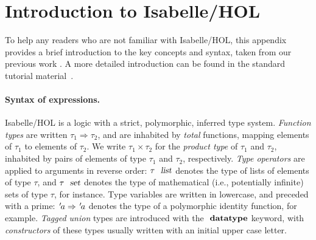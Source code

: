 \section{Introduction to Isabelle/HOL}
\label{sect:appendix:isabelle}

To help any readers who are not familiar with Isabelle/HOL, this appendix provides a brief introduction to the key concepts and syntax, taken from our previous work \cite{Gomes:2017gy}.
A more detailed introduction can be found in the standard tutorial material~\cite{DBLP:books/sp/NipkowK14}.

\paragraph{Syntax of expressions.}

Isabelle/HOL is a logic with a strict, polymorphic, inferred type system.
\emph{Function types} are written $\tau_1 \Rightarrow \tau_2$, and are inhabited by \emph{total} functions, mapping elements of $\tau_1$ to elements of $\tau_2$.
We write $\tau_1 \times \tau_2$ for the \emph{product type} of $\tau_1$ and $\tau_2$, inhabited by pairs of elements of type $\tau_1$ and $\tau_2$, respectively.
\emph{Type operators} are applied to arguments in reverse order: $\tau\ \isa{list}$ denotes the type of lists of elements of type $\tau$, and $\tau\ \isa{set}$ denotes the type of mathematical (i.e., potentially infinite) sets of type $\tau$, for instance.
Type variables are written in lowercase, and preceded with a prime: ${\emph{$\mskip2mu{'}\mskip-2mu$}}a \Rightarrow {\emph{$\mskip2mu{'}\mskip-2mu$}}a$ denotes the type of a polymorphic identity function, for example.
\emph{Tagged union} types are introduced with the $\isacommand{datatype}$ keyword, with \emph{constructors} of these types usually written with an initial upper case letter.

